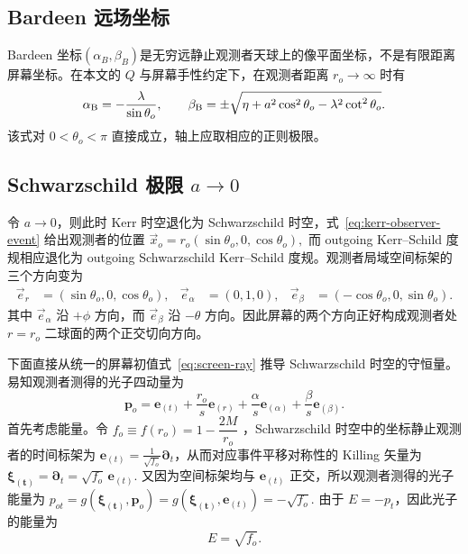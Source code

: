 \documentclass[UTF8,11pt,a4paper,fontset=fandol]{ctexart}
\newcommand{\er}{\bm{e}_{(r)}}
\newcommand{\ealpha}{\bm{e}_{(\alpha)}}
\newcommand{\ebeta}{\bm{e}_{(\beta)}}
\newcommand{\et}{\bm{e}_{(t)}}
\begin{document}
\subsection{Bardeen 远场坐标}

Bardeen 坐标$(\alpha_B,\beta_B)$是无穷远静止观测者天球上的像平面坐标，不是有限距离屏幕坐标。在本文的 \(Q\) 与屏幕手性约定下，在观测者距离 \(r_o\to\infty\) 时有\cite{Bardeen1973,PerlickTsupko2022}
\begin{equation}
 \alpha_{\rm B}=-\frac{\lambda}{\sin\theta_o},
 \qquad\beta_{\rm B}=\pm\sqrt{\eta+a^2\cos^2\theta_o-\lambda^2\cot^2\theta_o}. \label{eq:bardeen}
\end{equation}
该式对 \(0<\theta_o<\pi\) 直接成立，轴上应取相应的正则极限。


\subsection{Schwarzschild 极限 \texorpdfstring{\(a\to0\)}{a to 0}}

令 \(a\to0\)，则此时 Kerr 时空退化为 Schwarzschild 时空，式~\eqref{eq:kerr-observer-event} 给出观测者的位置
\(
\vec{x}_o=r_o(\sin\theta_o,0,\cos\theta_o),
\)
而 outgoing Kerr--Schild 度规相应退化为 outgoing Schwarzschild Kerr--Schild 度规。观测者局域空间标架的三个方向变为
\begin{align}
 \vec{e}_r&=(\sin\theta_o,0,\cos\theta_o),&
 \vec{e}_\alpha&=(0,1,0),&
 \vec{e}_\beta&=(-\cos\theta_o,0,\sin\theta_o).
 \label{eq:schwarzschild-screen-basis}
\end{align}
其中 \(\vec e_\alpha\) 沿 \(+\phi\) 方向，而 \(\vec e_\beta\) 沿 \(-\theta\) 方向。因此屏幕的两个方向正好构成观测者处 \(r=r_o\) 二球面的两个正交切向方向。

下面直接从统一的屏幕初值式~\eqref{eq:screen-ray} 推导 Schwarzschild 时空的守恒量。易知观测者测得的光子四动量为
\begin{equation}
 \bm{p}_o=\et+\frac{r_o}{s}\er
 +\frac{\alpha}{s}\ealpha+\frac{\beta}{s}\ebeta. \label{eq:screen-ray}
\end{equation}
首先考虑能量。令
\(
f_o\equiv f(r_o)=1-\dfrac{2M}{r_o}
\)
，Schwarzschild 时空中的坐标静止观测者的时间标架为
\(
\et=\frac{1}{\sqrt{f_o}}\bm{\partial}_t\)，从而对应事件平移对称性的 Killing 矢量为\(\bm{\xi_{(t)}}=\bm{\partial}_t=\sqrt{f_o}\,\et.\)
又因为空间标架均与 \(\et\) 正交，所以观测者测得的光子能量为
\(
p_{ot}
=g(\bm{\xi_{(t)}},\bm p_o)
=g(\bm{\xi_{(t)}},\et)
=-\sqrt{f_o}.
\)
由于 \(E=-p_t\)，因此光子的能量为
\begin{equation}
E=\sqrt{f_o}.
\end{equation}
\end{document}
